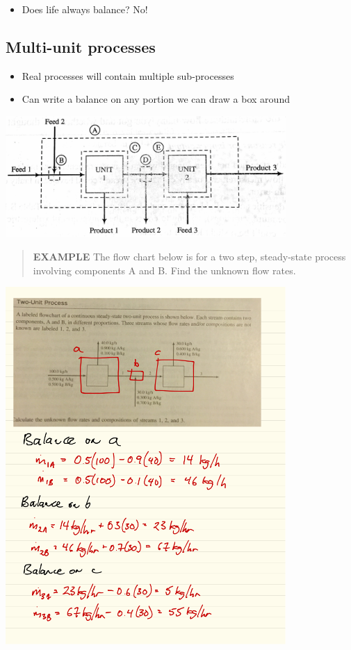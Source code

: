 \documentclass[11pt]{article}
\begin{document}
\begin{itemize}
\item Does life always balance?  No!
\end{itemize}

\subsection{Multi-unit processes}
\label{sec-5-4}
\begin{itemize}
\item Real processes will contain multiple sub-processes
\item Can write a balance on any portion we can draw a box around
\end{itemize}

\includegraphics[width=0.8\textwidth]{./figs/Multiprocess.png}

\begin{quote}
\textbf{EXAMPLE} The flow chart below is for a two step, steady-state process involving components A and B.  Find the unknown flow rates.
\end{quote}

\includegraphics[width=0.8\textwidth]{./figs/Two-unit-soln.png}
\end{document}
